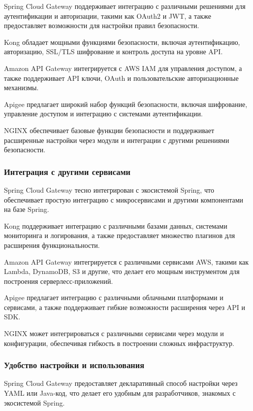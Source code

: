 Spring Cloud Gateway поддерживает интеграцию с различными решениями для аутентификации и авторизации, такими как OAuth2
и JWT, а также предоставляет возможности для настройки правил безопасности.

Kong обладает мощными функциями безопасности, включая аутентификацию, авторизацию, SSL/TLS шифрование и контроль доступа
на уровне API\@.

Amazon API Gateway интегрируется с AWS IAM для управления доступом, а также поддерживает API ключи, OAuth и
пользовательские авторизационные механизмы.

Apigee предлагает широкий набор функций безопасности, включая шифрование, управление доступом и интеграцию с системами
аутентификации.

NGINX обеспечивает базовые функции безопасности и поддерживает расширенные настройки через модули и интеграции с другими
решениями безопасности.

\subsubsection{Интеграция с другими сервисами}

Spring Cloud Gateway тесно интегрирован с экосистемой Spring, что обеспечивает простую интеграцию с микросервисами и
другими компонентами на базе Spring.

Kong поддерживает интеграцию с различными базами данных, системами мониторинга и логирования, а также предоставляет
множество плагинов для расширения функциональности.

Amazon API Gateway интегрируется с различными сервисами AWS, такими как Lambda, DynamoDB, S3 и другие, что делает его
мощным инструментом для построения серверлесс-приложений.

Apigee предлагает интеграцию с различными облачными платформами и сервисами, а также поддерживает гибкие возможности
расширения через API и SDK\@.

NGINX может интегрироваться с различными сервисами через модули и конфигурации, обеспечивая гибкость в построении
сложных инфраструктур.

\subsubsection{Удобство настройки и использования}

Spring Cloud Gateway предоставляет декларативный способ настройки через YAML или Java-код, что делает его удобным для
разработчиков, знакомых с экосистемой Spring.


